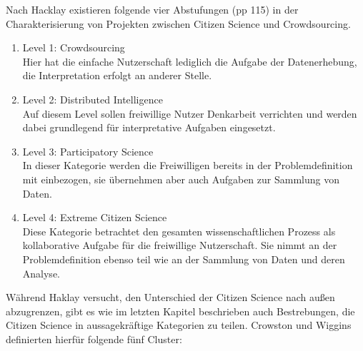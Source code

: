 \documentclass{article}
\begin{document}
Nach Hacklay existieren folgende vier Abstufungen\cite{Haklay} (pp 115) in der Charakterisierung von Projekten zwischen Citizen Science und Crowdsourcing.
\begin{enumerate}
\item{Level 1: Crowdsourcing\\
Hier hat die einfache Nutzerschaft lediglich die Aufgabe der Datenerhebung, die Interpretation erfolgt an anderer Stelle.}
\item{Level 2: Distributed Intelligence\\
Auf diesem Level sollen freiwillige Nutzer Denkarbeit verrichten und werden dabei grundlegend für interpretative Aufgaben eingesetzt.}
\item{Level 3: Participatory Science\\
In dieser Kategorie werden die Freiwilligen bereits in der Problemdefinition mit einbezogen, sie übernehmen aber auch Aufgaben zur Sammlung von Daten.}
\item{Level 4: Extreme Citizen Science\\
Diese Kategorie betrachtet den gesamten wissenschaftlichen Prozess als kollaborative Aufgabe für die freiwillige Nutzerschaft.
Sie nimmt an der Problemdefinition ebenso teil wie an der Sammlung von Daten und deren Analyse.}
\end{enumerate}
Während Haklay versucht, den Unterschied der Citizen Science nach außen abzugrenzen, gibt es wie im letzten Kapitel beschrieben auch
Bestrebungen, die Citizen Science in aussagekräftige Kategorien zu teilen. Crowston und Wiggins definierten hierfür folgende fünf Cluster:
\end{document}
